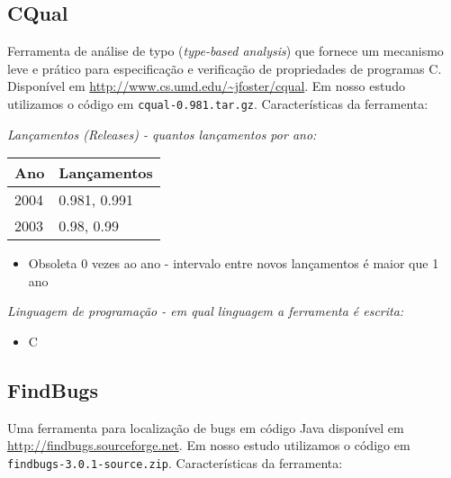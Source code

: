 \subsection{CQual}

Ferramenta de análise de typo ({\it type-based analysis}) que fornece um
mecanismo leve e prático para especificação e verificação de propriedades de
programas C. Disponível em \url{http://www.cs.umd.edu/~jfoster/cqual}. Em
nosso estudo utilizamos o código em \texttt{cqual-0.981.tar.gz}.
Características da ferramenta:

\begin{description}

  \item {\it Lançamentos ({\it Releases}) - quantos lançamentos por ano:}
    \begin{table}[h!]
      \centering
      \begin{tabular}{| l | l |}
        \hline
        Ano  & Lançamentos  \\
        \hline
        2004 & 0.981, 0.991 \\
        2003 & 0.98, 0.99   \\
        \hline
      \end{tabular}
    \end{table}
    \begin{itemize}
      \item Obsoleta $0$ vezes ao ano - intervalo entre novos lançamentos é maior que 1 ano
    \end{itemize}

  \item {\it Linguagem de programação - em qual linguagem a ferramenta é escrita:}
    \begin{itemize}
      \item C
    \end{itemize}

\end{description}

\subsection{FindBugs}

Uma ferramenta para localização de bugs em código Java disponível em
\url{http://findbugs.sourceforge.net}. Em nosso estudo utilizamos o código em
\texttt{findbugs-3.0.1-source.zip}. Características da ferramenta:

